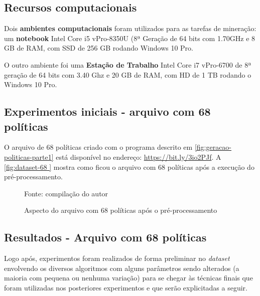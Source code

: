 \subsection{Recursos computacionais}
Dois \textbf{ambientes computacionais} foram utilizados para as tarefas de mineração: um \textbf{notebook}  Intel Core i5 vPro-8350U (8ª Geração de 64 bits com 1.70GHz e 8 GB de RAM, com SSD de 256 GB rodando Windows 10 Pro.

O outro ambiente foi uma \textbf{Estação de Trabalho} Intel Core i7 vPro-6700 de 8ª geração de 64 bits com 3.40 Ghz e 20 GB de RAM, com HD de 1 TB rodando o Windows 10 Pro.

\subsection{Experimentos iniciais - arquivo com 68 políticas}\label{exp:iniciais}
O arquivo de 68 políticas criado com o programa descrito em \ref{fig:geracao-politicas-parte1} está disponível no endereço: \hyperlink{https://bit.ly/3io2PJf}{https://bit.ly/3io2PJf}.
A \autoref{fig:dataset-68 } mostra como ficou o arquivo com 68 políticas após a execução do pré-processamento.
\begin{figure}[h!]
	\centering
	\caption{Aspecto do arquivo com 68 políticas após o pré-processamento}
	
	\label{fig:dataset-68 }
	{\scriptsize Fonte: compilação do autor}
\end{figure}



\subsection{Resultados - Arquivo com 68 políticas}
Logo após, experimentos foram realizados de forma preliminar no \textit{dataset} envolvendo os diversos algoritmos com alguns parâmetros sendo alterados (a maioria com pequena ou nenhuma variação) para se chegar às técnicas finais que foram utilizadas nos posteriores experimentos e que serão explicitadas a seguir.

